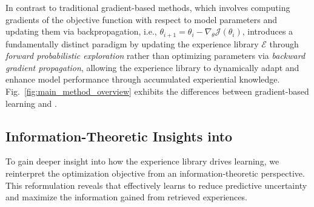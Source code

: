 In contrast to traditional gradient-based methods, which involves computing gradients of the objective function with respect to model parameters and updating them via backpropagation, i.e., $\theta_{i+1} = \theta_i - \nabla_\theta \mathcal{J}(\theta_i)$, \method{} introduces a fundamentally distinct paradigm by updating the experience library $\mathcal{E}$ through \textit{forward probabilistic exploration} rather than optimizing parameters via \textit{backward gradient propagation}, allowing the experience library to dynamically adapt and enhance model performance through accumulated experiential knowledge.
Fig.~\ref{fig:main_method_overview} exhibits the differences between gradient-based learning and \method{}.


\subsection{Information-Theoretic Insights into \method{}}
To gain deeper insight into how the experience library drives learning, we reinterpret the optimization objective from an information-theoretic perspective. 
This reformulation reveals that \method{} effectively learns to reduce predictive uncertainty and maximize the information gained from retrieved experiences.

